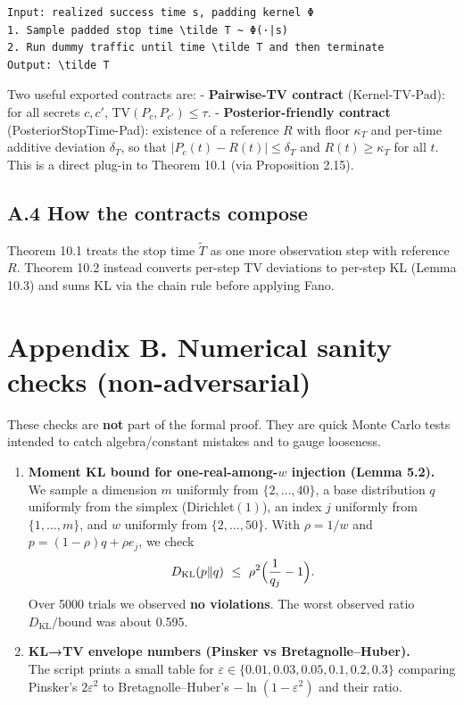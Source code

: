\documentclass[11pt]{article}
\begin{document}
\begin{verbatim}
Input: realized success time s, padding kernel Φ
1. Sample padded stop time \tilde T ~ Φ(·|s)
2. Run dummy traffic until time \tilde T and then terminate
Output: \tilde T
\end{verbatim}

Two useful exported contracts are: - \textbf{Pairwise-TV contract}
(Kernel-TV-Pad): for all secrets \(c,c'\),
\(\mathrm{TV}(P_c,P_{c'})\le \tau\). - \textbf{Posterior-friendly
contract} (PosteriorStopTime-Pad): existence of a reference \(R\) with
floor \(\kappa_T\) and per-time additive deviation \(\delta_T\), so that
\(|P_c(t)-R(t)|\le \delta_T\) and \(R(t)\ge \kappa_T\) for all \(t\).
This is a direct plug-in to Theorem 10.1 (via Proposition 2.15).

\hypertarget{a.4-how-the-contracts-compose}{%
\subsection{A.4 How the contracts
compose}\label{a.4-how-the-contracts-compose}}

Theorem 10.1 treats the stop time \(\tilde T\) as one more observation
step with reference \(R\). Theorem 10.2 instead converts per-step TV
deviations to per-step KL (Lemma 10.3) and sums KL via the chain rule
before applying Fano.

\hypertarget{appendix-b.-numerical-sanity-checks-non-adversarial}{%
\section{Appendix B. Numerical sanity checks
(non-adversarial)}\label{appendix-b.-numerical-sanity-checks-non-adversarial}}

These checks are \textbf{not} part of the formal proof. They are quick
Monte Carlo tests intended to catch algebra/constant mistakes and to
gauge looseness.

\begin{enumerate}
\def\labelenumi{\arabic{enumi})}
\item
  \textbf{Moment KL bound for one-real-among-\(w\) injection (Lemma
  5.2).}\\
  We sample a dimension \(m\) uniformly from \(\{2,\dots,40\}\), a base
  distribution \(q\) uniformly from the simplex (Dirichlet\((1)\)), an
  index \(j\) uniformly from \(\{1,\dots,m\}\), and \(w\) uniformly from
  \(\{2,\dots,50\}\). With \(\rho=1/w\) and \(p=(1-\rho)q+\rho e_j\), we
  check
  \[D_{\mathrm{KL}}(p\|q)\ \le\ \rho^2\Bigl(\frac{1}{q_j}-1\Bigr).\]
  Over 5000 trials we observed \textbf{no violations}. The worst
  observed ratio \(D_{\mathrm{KL}}/\text{bound}\) was about 0.595.
\item
  \textbf{KL→TV envelope numbers (Pinsker vs Bretagnolle--Huber).}\\
  The script prints a small table for
  \(\varepsilon\in\{0.01,0.03,0.05,0.1,0.2,0.3\}\) comparing Pinsker's
  \(2\varepsilon^2\) to Bretagnolle--Huber's \(-\ln(1-\varepsilon^2)\)
  and their ratio.
\end{enumerate}
\end{document}
